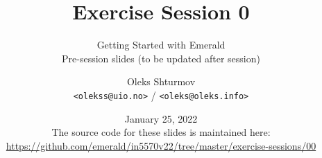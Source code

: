 \documentclass[xcolor=table]{beamer}
\title{{\Large Exercise Session 0}}
\subtitle{Getting Started with Emerald\\Pre-session slides (to be updated after session)}
\institute{{University of Oslo}\\[0.2em] IN[59]570: Distributed Objects}
\author{Oleks Shturmov\\[-0.2em]%
  {\footnotesize \texttt{<olekss@uio.no>} / \texttt{<oleks@oleks.info>}}
}
\date{January 25, 2022\\[2em]
{\scriptsize The source code for these slides is maintained here: \\[-0.5em] {\tiny%
\url{https://github.com/emerald/in5570v22/tree/master/exercise-sessions/00}}%
}}
\begin{document}
\begin{frame} \titlepage \end{frame}




















\end{document}
